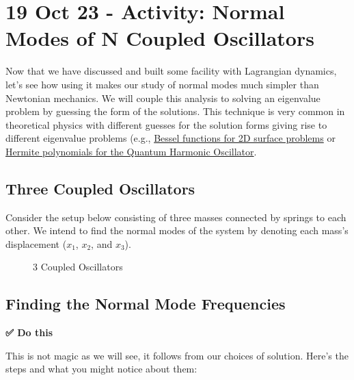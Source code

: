 \section{19 Oct 23 - Activity: Normal Modes of N Coupled
Oscillators}\label{oct-23---activity-normal-modes-of-n-coupled-oscillators}

Now that we have discussed and built some facility with Lagrangian
dynamics, let's see how using it makes our study of normal modes much
simpler than Newtonian mechanics. We will couple this analysis to
solving an eigenvalue problem by guessing the form of the solutions.
This technique is very common in theoretical physics with different
guesses for the solution forms giving rise to different eigenvalue
problems (e.g.,
\href{https://en.wikipedia.org/wiki/Bessel_function}{Bessel functions
for 2D surface problems} or
\href{https://en.wikipedia.org/wiki/Hermite_polynomials}{Hermite
polynomials for the Quantum Harmonic Oscillator}.

\subsection{Three Coupled Oscillators}\label{three-coupled-oscillators}

Consider the setup below consisting of three masses connected by springs
to each other. We intend to find the normal modes of the system by
denoting each mass's displacement (\(x_1\), \(x_2\), and \(x_3\)).

\begin{figure}
\centering
{}
\caption{3 Coupled Oscillators}
\end{figure}

\subsection{Finding the Normal Mode
Frequencies}\label{finding-the-normal-mode-frequencies}

\textbf{✅ Do this}

This is not magic as we will see, it follows from our choices of
solution. Here's the steps and what you might notice about them:

